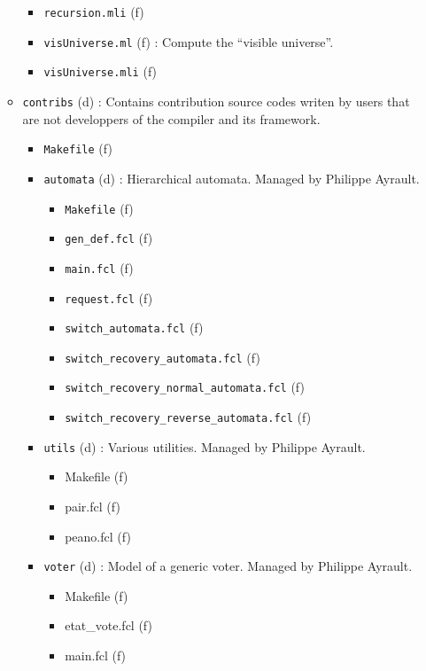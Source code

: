\begin{itemize}
\begin{itemize}
\begin{itemize}
        \item {\tt recursion.mli} (f)
        \item {\tt visUniverse.ml} (f) : Compute the ``visible
          universe''.
        \item {\tt visUniverse.mli} (f)
        \end{itemize}
      \item {\tt contribs} (d) : Contains contribution source codes
        writen by users that are not developpers of the compiler and
        its framework.
        \begin{itemize}
          \item {\tt Makefile} (f)
          \item {\tt automata} (d) : Hierarchical automata. Managed by
            Philippe Ayrault.
            \begin{itemize}
              \item {\tt Makefile} (f)
              \item {\tt gen\_def.fcl} (f)
              \item {\tt main.fcl} (f)
              \item {\tt request.fcl} (f)
              \item {\tt switch\_automata.fcl} (f)
              \item {\tt switch\_recovery\_automata.fcl} (f)
              \item {\tt switch\_recovery\_normal\_automata.fcl} (f)
              \item {\tt switch\_recovery\_reverse\_automata.fcl} (f)
            \end{itemize}
          \item {\tt utils} (d) : Various utilities. Managed by
            Philippe Ayrault.
            \begin{itemize}
            \item {Makefile} (f)
            \item {pair.fcl} (f)
            \item {peano.fcl} (f)
            \end{itemize}
          \item {\tt voter} (d) : Model of a generic voter. Managed by
            Philippe Ayrault.
            \begin{itemize}
              \item {Makefile} (f)
              \item {etat\_vote.fcl} (f)
              \item {main.fcl} (f)

\end{itemize}
\end{itemize}
\end{itemize}
\end{itemize}
